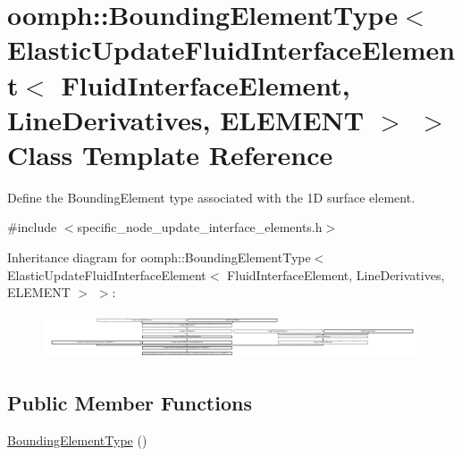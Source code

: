\hypertarget{classoomph_1_1BoundingElementType_3_01ElasticUpdateFluidInterfaceElement_3_01FluidInterfaceEleme25258208c656cd18bb5e78a946d0c1ca}{}\section{oomph\+:\+:Bounding\+Element\+Type$<$ Elastic\+Update\+Fluid\+Interface\+Element$<$ Fluid\+Interface\+Element, Line\+Derivatives, E\+L\+E\+M\+E\+NT $>$ $>$ Class Template Reference}
\label{classoomph_1_1BoundingElementType_3_01ElasticUpdateFluidInterfaceElement_3_01FluidInterfaceEleme25258208c656cd18bb5e78a946d0c1ca}


Define the Bounding\+Element type associated with the 1D surface element.  




{\ttfamily \#include $<$specific\+\_\+node\+\_\+update\+\_\+interface\+\_\+elements.\+h$>$}

Inheritance diagram for oomph\+:\+:Bounding\+Element\+Type$<$ Elastic\+Update\+Fluid\+Interface\+Element$<$ Fluid\+Interface\+Element, Line\+Derivatives, E\+L\+E\+M\+E\+NT $>$ $>$\+:\begin{figure}[H]
\begin{center}
\leavevmode
\includegraphics[height=1.361111cm]{classoomph_1_1BoundingElementType_3_01ElasticUpdateFluidInterfaceElement_3_01FluidInterfaceEleme25258208c656cd18bb5e78a946d0c1ca}
\end{center}
\end{figure}
\subsection*{Public Member Functions}
\begin{DoxyCompactItemize}
\item 
\hyperlink{classoomph_1_1BoundingElementType_3_01ElasticUpdateFluidInterfaceElement_3_01FluidInterfaceEleme25258208c656cd18bb5e78a946d0c1ca_a3b2358d710986e238d7e4e5291bc0d1b}{Bounding\+Element\+Type} ()
\end{DoxyCompactItemize}
